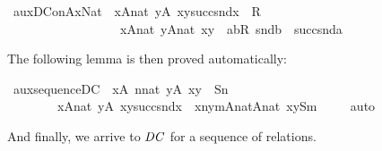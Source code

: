 \begin{isabelle}
\isamarkupfalse%
\ aux{\isacharunderscore}DC{\isacharunderscore}on{\isacharunderscore}AxNat{}\ {\isacharcolon}\ {\isachardoublequoteopen}{\isasymforall}x{\isasymin}A{\isasymtimes}nat{\isachardot}\ {\isasymexists}y{\isasymin}A{\isachardot}\ {\isasymlangle}x{\isacharcomma}{\isasymlangle}y{\isacharcomma}succ{\isacharparenleft}snd{\isacharparenleft}x{\isacharparenright}{\isacharparenright}{\isasymrangle}{\isasymrangle}\ {\isasymin}\ R\ {\isasymLongrightarrow}\isanewline
\ \ \ \ \ \ \ \ \ \ \ \ \ \ \ \ \ \ {\isasymforall}x{\isasymin}A{\isasymtimes}nat{\isachardot}\ {\isasymexists}y{\isasymin}A{\isasymtimes}nat{\isachardot}\ {\isasymlangle}x{\isacharcomma}y{\isasymrangle}\ {\isasymin}\ {\isacharbraceleft}{\isasymlangle}a{\isacharcomma}b{\isasymrangle}{\isasymin}R{\isachardot}\ snd{\isacharparenleft}b{\isacharparenright}\ {\isacharequal}\ succ{\isacharparenleft}snd{\isacharparenleft}a{\isacharparenright}{\isacharparenright}{\isacharbraceright}{\isachardoublequoteclose}
\end{isabelle}
%
The following lemma is then proved automatically:

\begin{isabelle}
\isamarkupfalse%
\ aux{\isacharunderscore}sequence{\isacharunderscore}DC{}\ {\isacharcolon}\ {\isachardoublequoteopen}{\isasymforall}x{\isasymin}A{\isachardot}\ {\isasymforall}n{\isasymin}nat{\isachardot}\ {\isasymexists}y{\isasymin}A{\isachardot}\ {\isasymlangle}x{\isacharcomma}y{\isasymrangle}\ {\isasymin}\ S{\isacharbackquote}n\ {\isasymLongrightarrow}\isanewline
\ \ \ \ \ \ \ \ {\isasymforall}x{\isasymin}A{\isasymtimes}nat{\isachardot}\ {\isasymexists}y{\isasymin}A{\isachardot}\ {\isasymlangle}x{\isacharcomma}{\isasymlangle}y{\isacharcomma}succ{\isacharparenleft}snd{\isacharparenleft}x{\isacharparenright}{\isacharparenright}{\isasymrangle}{\isasymrangle}\ {\isasymin}\ {\isacharbraceleft}{\isasymlangle}{\isasymlangle}x{\isacharcomma}n{\isasymrangle}{\isacharcomma}{\isasymlangle}y{\isacharcomma}m{\isasymrangle}{\isasymrangle}{\isasymin}{\isacharparenleft}A{\isasymtimes}nat{\isacharparenright}{\isasymtimes}{\isacharparenleft}A{\isasymtimes}nat{\isacharparenright}{\isachardot}\ {\isasymlangle}x{\isacharcomma}y{\isasymrangle}{\isasymin}S{\isacharbackquote}m\ {\isacharbraceright}{\isachardoublequoteclose}\isanewline
\ \ %
\isamarkupfalse%
\ auto%
\end{isabelle}
%
And finally, we arrive to $\mathit{DC}$ for a sequence of relations.


